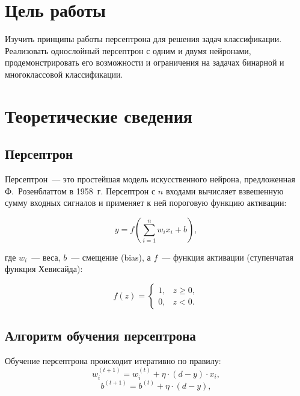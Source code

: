 \documentclass[14pt,a4paper]{extarticle}
\begin{document}

\tableofcontents

\newpage

\section{Цель работы}

Изучить принципы работы персептрона для решения задач классификации. Реализовать однослойный персептрон с одним и двумя нейронами, продемонстрировать его возможности и ограничения на задачах бинарной и многоклассовой классификации.

\section{Теоретические сведения}

\subsection{Персептрон}

Персептрон~--- это простейшая модель искусственного нейрона, предложенная Ф.~Розенблаттом в 1958~г. Персептрон с $n$ входами вычисляет взвешенную сумму входных сигналов и применяет к ней пороговую функцию активации:

\begin{equation}
y = f\left(\sum_{i=1}^{n} w_i x_i + b\right),
\end{equation}

где $w_i$~--- веса, $b$~--- смещение (bias), а $f$~--- функция активации (ступенчатая функция Хевисайда):

\begin{equation}
f(z) = \begin{cases} 1, & z \geq 0, \\ 0, & z < 0. \end{cases}
\end{equation}

\subsection{Алгоритм обучения персептрона}

Обучение персептрона происходит итеративно по правилу:
\begin{equation}
w_i^{(t+1)} = w_i^{(t)} + \eta \cdot (d - y) \cdot x_i,
\end{equation}
\begin{equation}
b^{(t+1)} = b^{(t)} + \eta \cdot (d - y),
\end{equation}
\end{document}
